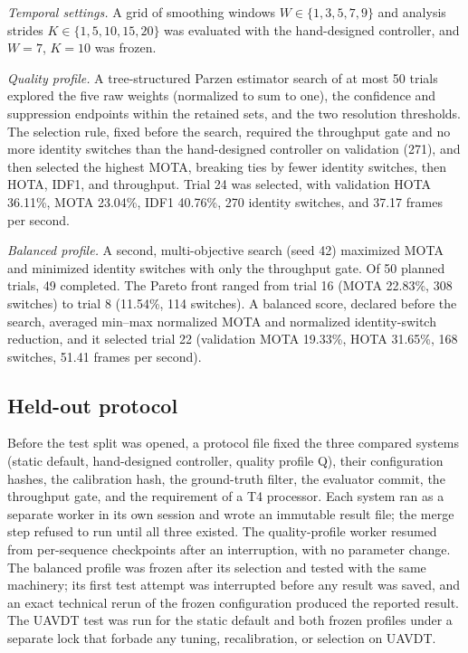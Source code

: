 \emph{Temporal settings.} A grid of smoothing windows $W\in\{1,3,5,7,9\}$ and analysis strides $K\in\{1,5,10,15,20\}$ was evaluated with the hand-designed controller, and $W=7$, $K=10$ was frozen.

\emph{Quality profile.} A tree-structured Parzen estimator search of at most 50 trials explored the five raw weights (normalized to sum to one), the confidence and suppression endpoints within the retained sets, and the two resolution thresholds. The selection rule, fixed before the search, required the throughput gate and no more identity switches than the hand-designed controller on validation (271), and then selected the highest MOTA, breaking ties by fewer identity switches, then HOTA, IDF1, and throughput. Trial 24 was selected, with validation HOTA 36.11\%, MOTA 23.04\%, IDF1 40.76\%, 270 identity switches, and 37.17 frames per second.

\emph{Balanced profile.} A second, multi-objective search (seed 42) maximized MOTA and minimized identity switches with only the throughput gate. Of 50 planned trials, 49 completed. The Pareto front ranged from trial 16 (MOTA 22.83\%, 308 switches) to trial 8 (11.54\%, 114 switches). A balanced score, declared before the search, averaged min--max normalized MOTA and normalized identity-switch reduction, and it selected trial 22 (validation MOTA 19.33\%, HOTA 31.65\%, 168 switches, 51.41 frames per second).

\subsection{Held-out protocol}
Before the test split was opened, a protocol file fixed the three compared systems (static default, hand-designed controller, quality profile Q), their configuration hashes, the calibration hash, the ground-truth filter, the evaluator commit, the throughput gate, and the requirement of a T4 processor. Each system ran as a separate worker in its own session and wrote an immutable result file; the merge step refused to run until all three existed. The quality-profile worker resumed from per-sequence checkpoints after an interruption, with no parameter change. The balanced profile was frozen after its selection and tested with the same machinery; its first test attempt was interrupted before any result was saved, and an exact technical rerun of the frozen configuration produced the reported result. The UAVDT test was run for the static default and both frozen profiles under a separate lock that forbade any tuning, recalibration, or selection on UAVDT.

